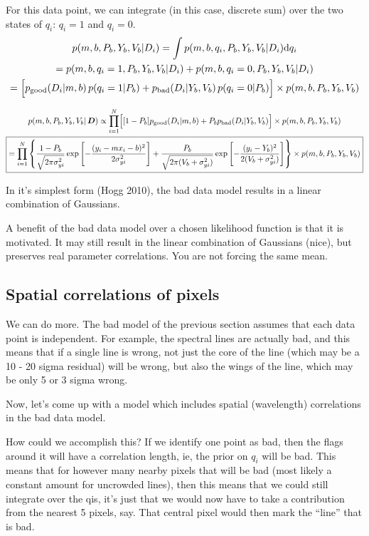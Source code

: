 \documentclass[preprint]{aastex} %
\begin{document}
For this data point, we can integrate (in this case, discrete sum) over the two states of $q_i$: $q_i = 1$ and $q_i = 0$. 
\begin{multline}
  p(m, b, P_b, Y_b, V_b | D_i)  =  \int p( m, b, q_i, P_b, Y_b, V_b| D_i) {\rm d} q_i \\
  = p(m, b, q_i=1, P_b, Y_b, V_b | D_i) + p(m, b, q_i=0, P_b, Y_b, V_b | D_i) \\
  = \Bigl[ p_{\rm good}(D_i | m,b)\, p(q_i=1 | P_b) +  p_{\rm bad}(D_i | Y_b, V_b)\, p(q_i=0 | P_b)\Bigr] \times p(m,b,P_b, Y_b,V_b) 
\end{multline}

\begin{multline}
  p(m,b,P_b,Y_b,V_b|\,{\bm D}) \propto \prod_{i=1}^N \Bigl [ [1 - P_b] p_{\rm good}(D_i | m, b)  + P_b p_{\rm bad}(D_i | Y_b, V_b)\Bigr ] \times p(m,b,P_b, Y_b, V_b)\\
  \boxed{
    = \prod_{i=1}^N \left\{ \frac{1 - P_b}{\sqrt{2 \pi \sigma_{yi}^2}} \exp \left[ - \frac{(y_i - m x_i - b)^2}{2 \sigma_{yi}^2} \right] + \frac{P_b}{\sqrt{2 \pi (V_b + \sigma_{yi}^2)}} \exp \left[- \frac{(y_i - Y_b)^2}{2 (V_b + \sigma_{yi}^2)} \right] \right\}
  \times p(m,b,P_b,Y_b,V_b)}
\end{multline}

In it's simplest form (Hogg 2010), the bad data model results in a linear combination of Gaussians. 

A benefit of the bad data model over a chosen likelihood function is that it is motivated. It may still result in the linear combination of Gaussians (nice), but preserves real parameter correlations. You are not forcing the same mean.


\subsection{Spatial correlations of pixels}
We can do more. The bad model of the previous section assumes that each data point is independent. For example, the spectral lines are actually bad, and this means that if a single line is wrong, not just the core of the line (which may be a 10 - 20 sigma residual) will be wrong, but also the wings of the line, which may be only 5 or 3 sigma wrong.

Now, let's come up with a model which includes spatial (wavelength) correlations in the bad data model.

How could we accomplish this? If we identify one point as bad, then the flags around it will have a correlation length, ie, the prior on $q_i$ will be bad. This means that for however many nearby pixels that will be bad (most likely a constant amount for uncrowded lines), then this means that we could still integrate over the qis, it's just that we would now have to take a contribution from the nearest 5 pixels, say. That central pixel would then mark the ``line'' that is bad. 
\end{document}

